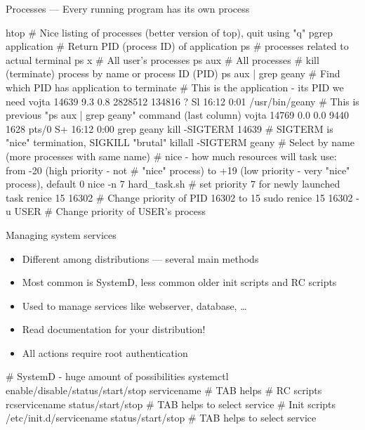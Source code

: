 \documentclass[hyperref={bookmarks=true, unicode=true, colorlinks=true, pdftitle={Linux, command line and MetaCentrum}, plainpages=false, pdfauthor={Vojtech Zeisek}, pdfsubject={Course about use of Linux command line, writing shell scripts and using MetaCentrum of CESNET}, pdfcreator={XeLaTeX, http://www.xelatex.org/}, pdfkeywords={Linux, GNU, BASH, shell, command line, MetaCentrum}, linkcolor=Sienna, anchorcolor=black, citecolor=green, filecolor=magenta, menucolor=Sienna, urlcolor=cyan, pdftex}, compress, ucs, xelatex, xcolor=svgnames, 11pt]{beamer}
\begin{document}
\begin{frame}[fragile]{Processes --- Every running program has its own process}
  \begin{bashcode}
    htop # Nice listing of processes (better version of top), quit using "q"
    pgrep application # Return PID (process ID) of application
    ps # processes related to actual terminal
    ps x # All user's processes
    ps aux # All processes
    # kill (terminate) process by name or process ID (PID)
    ps aux | grep geany # Find which PID has application to terminate
    # This is the application - its PID we need
    vojta 14639 9.3 0.8 2828512 134816 ?   Sl 16:12 0:01 /usr/bin/geany
    # This is previous "ps aux | grep geany" command (last column)
    vojta 14769 0.0 0.0   9440  1628 pts/0 S+ 16:12 0:00 grep geany
    kill -SIGTERM 14639 # SIGTERM is "nice" termination, SIGKILL "brutal"
    killall -SIGTERM geany # Select by name (more processes with same name)
    # nice - how much resources will task use: from -20 (high priority - not
    # "nice" process) to +19 (low priority - very "nice" process), default 0
    nice -n 7 hard_task.sh # set priority 7 for newly launched task
    renice 15 16302 # Change priority of PID 16302 to 15
    sudo renice 15 16302 -u USER # Change priority of USER's process
  \end{bashcode}
\end{frame}

\begin{frame}[fragile]{Managing system services}
\begin{itemize}
  \item Different among distributions --- several main methods
  \item Most common is SystemD, less common older init scripts and RC scripts
  \item Used to manage services like webserver, database, \ldots
  \item \alert{Read documentation for your distribution!}
  \item All actions require root authentication
\end{itemize}
  \begin{bashcode}
    # SystemD - huge amount of possibilities
    systemctl enable/disable/status/start/stop servicename # TAB helps
    # RC scripts
    rcservicename status/start/stop # TAB helps to select service
    # Init scripts
    /etc/init.d/servicename status/start/stop # TAB helps to select service
  \end{bashcode}
\end{frame}
\end{document}
